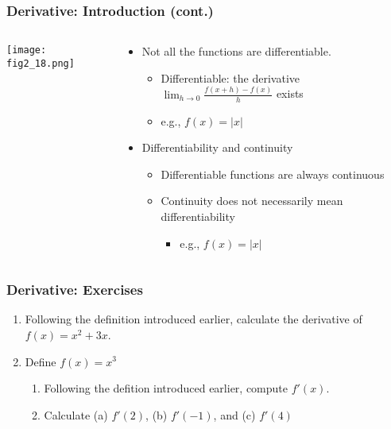 \documentclass[pdflatex, 12pt]{beamer}
\begin{document}
\begin{frame}
\frametitle{Derivative: Introduction (cont.)}
\begin{columns}
\begin{column}{0.5\textwidth}
\centering
\texttt{[image: fig2\_18.png]}
\end{column}
\begin{column}{0.5\textwidth}
\begin{itemize}
\item Not all the functions are differentiable.
 \begin{itemize}
 \item Differentiable: the derivative $\lim_{h \to 0} \frac{f(x + h) - f(x)}{h}$ exists
 \item e.g., $f(x) = |x|$
 \end{itemize}
\vspace{0.4cm}
\item Differentiability and continuity
 \begin{itemize}
 \item Differentiable functions are always continuous
 \item Continuity does not necessarily mean differentiability
  \begin{itemize}
  \item e.g., $f(x) = |x|$
  \end{itemize}
 \end{itemize}
\end{itemize}
\end{column}
\end{columns}
\end{frame}

\begin{frame}
\frametitle{Derivative: Exercises}
\begin{enumerate}
\item Following the definition introduced earlier, calculate the derivative of $f(x) = x^2 + 3x$.
\vspace{0.4cm}
\item Define $f(x) = x^3$
 \begin{enumerate}
 \item Following the defition introduced earlier, compute $f'(x)$.
 \item Calculate (a) $f'(2)$, (b) $f'(-1)$, and (c) $f'(4)$
 \end{enumerate}
\end{enumerate}
\end{frame}
\end{document}

